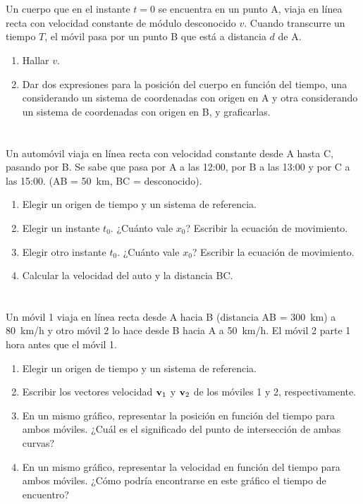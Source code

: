 \documentclass[a4paper, 12pt, fleqn]{article}
\begin{document}
\section{}

Un cuerpo que en el instante $t=0$ se encuentra en un punto A, viaja en línea recta con velocidad constante de módulo desconocido $v$. Cuando transcurre un tiempo $T$, el móvil pasa por un punto B que está a distancia $d$ de A.
    \begin{enumerate}[label=(\alph*)]
        \item Hallar $v$.
        \item Dar dos expresiones para la posición del cuerpo en función del tiempo, una considerando un sistema de coordenadas con origen en A y otra considerando un sistema de coordenadas con origen en B, y graficarlas.
    \end{enumerate}
    
\section{}

Un automóvil viaja en línea recta con velocidad constante desde A hasta C, pasando por B. Se sabe que pasa por A a las 12:00, por B a las 13:00 y por C a las 15:00. (AB = \SI{50}{km}, BC = desconocido).
    \begin{enumerate}[label=(\alph*)]
        \item Elegir un origen de tiempo y un sistema de referencia.
        \item Elegir un instante $t_0$. ¿Cuánto vale $x_0$? Escribir la ecuación de movimiento.
        \item Elegir otro instante $t_0$. ¿Cuánto vale $x_0$? Escribir la ecuación de movimiento.
        \item Calcular la velocidad del auto y la distancia BC.
    \end{enumerate}
    
\section{}
\label{ref:movil}

Un móvil 1 viaja en línea recta desde A hacia B (distancia AB = \SI{300}{km}) a \SI{80}{km/h} y otro móvil 2 lo hace desde B hacia A a \SI{50}{km/h}. El móvil 2 parte 1 hora antes que el móvil 1.
    \begin{enumerate}[label=(\alph*)]
        \item Elegir un origen de tiempo y un sistema de referencia.
        \item Escribir los vectores velocidad ${\bf v}_1$ y ${\bf v}_2$ de los móviles 1 y 2, respectivamente.
        \item En un mismo gráfico, representar la posición en función del tiempo para ambos móviles. ¿Cuál es el significado del punto de intersección de ambas curvas?
        \item En un mismo gráfico, representar la velocidad en función del tiempo para ambos móviles. ¿Cómo podría encontrarse en este gráfico el tiempo de encuentro?
    \end{enumerate}
    
\end{document}
